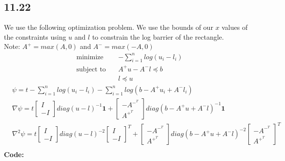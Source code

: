 \documentclass[12pt]{article}
\begin{document}
\subsection*{11.22}
We use the following optimization problem. We use  the bounds of our $x$ values of the constraints using $u$ and $l$ to constrain the log barrier of the rectangle.\\
Note: $A^+ = max(A, 0)$ and $A^- = max(-A, 0)$
\begin{equation*}
\begin{aligned}
& \underset{}{\text{minimize}}
& & -\sum_{i=1}^{n}log(u_i-l_i)\\
& \text{subject to}\
& & A^+u - A^-l \preceq b\\ 
&&& l \preceq u
\end{aligned}
\end{equation*}
\begin{equation*}
\begin{aligned}
& \psi = t-\sum_{i=1}^{n}log(u_i-l_i) - \sum_{i=1}^{n}log(b - A^+u_i + A^-l_i)\\
& \nabla \psi = t\begin{bmatrix} I\\ -I\end{bmatrix}diag(u-l)^{-1}\textbf{1} + \begin{bmatrix} -A^-^T \\ A^+^T\end{bmatrix}diag(b-A^+u+A^-l)^{-1}\textbf{1}\\
& \nabla^2 \psi = t\begin{bmatrix} I\\ -I\end{bmatrix}diag(u-l)^{-2}\begin{bmatrix} I\\ -I\end{bmatrix}^T + \begin{bmatrix} -A^-^T \\ A^+^T\end{bmatrix}diag(b-A^+u+A^-l)^{-2} \begin{bmatrix} -A^-^T\\ A^+^T\end{bmatrix}^T\\
\end{aligned}
\end{equation*}
\textbf{Code:}\\
\end{document}
